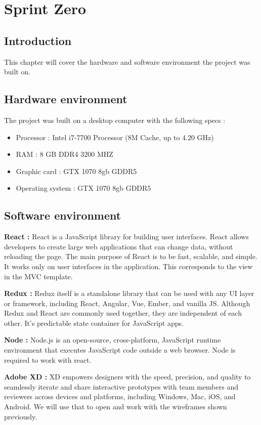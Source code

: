 \chapter{Sprint Zero}
\minitoc
\newpage
\section*{Introduction}
This chapter will cover the hardware and software environment the project was built on.
\section{Hardware environment}
The project was built on a desktop computer with the following specs :

\begin{itemize}
  \item Processor : Intel i7-7700 Processor (8M Cache, up to 4.20 GHz)
  \item RAM : 8 GB DDR4 3200 MHZ
  \item Graphic card : GTX  1070 8gb GDDR5
  \item Operating system : GTX  1070 8gb GDDR5
\end{itemize}
\section{Software environment}

\hfill \break
\textbf{React \cite{cite3} :} React is a JavaScript library for building user interfaces. React allows developers to create large web applications that can change data, without reloading the page. The main purpose of React is to be fast, scalable, and simple. It works only on user interfaces in the application. This corresponds to the view in the MVC template.


\textbf{Redux \cite{cite4} :} Redux itself is a standalone library that can be used with any UI layer or framework, including React, Angular, Vue, Ember, and vanilla JS. Although Redux and React are commonly used together, they are independent of each other. It's predictable state container for JavaScript apps.

\hfill \break
\hfill \break
\textbf{Node \cite{cite2} :} Node.js is an open-source, cross-platform, JavaScript runtime environment that executes JavaScript code outside a web browser. Node is required to work with react.

\hfill \break
\hfill \break
\textbf{Adobe XD \cite{cite9} :} XD empowers designers with the speed, precision, and quality to seamlessly iterate and share interactive prototypes with team members and reviewers across devices and platforms, including Windows, Mac, iOS, and Android. We will use that to open and work with the wireframes shown previously.

